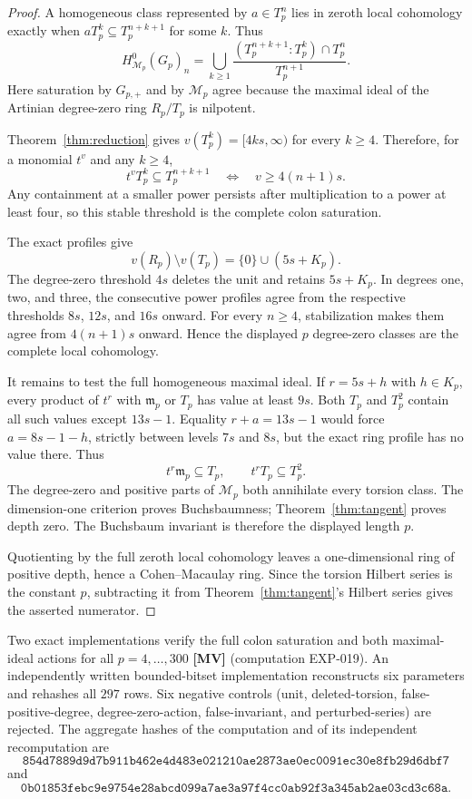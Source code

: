 \documentclass[11pt]{article}
\theoremstyle{definition}
\theoremstyle{remark}
\begin{document}
\begin{proof}
A homogeneous class represented by $a\in T_p^n$ lies in zeroth local cohomology exactly when
$aT_p^k\subseteq T_p^{n+k+1}$ for some $k$. Thus
\[
H^0_{\mathcal M_p}(G_p)_n=
\bigcup_{k\ge1}
\frac{(T_p^{n+k+1}:T_p^k)\cap T_p^n}{T_p^{n+1}}.
\]
Here saturation by $G_{p,+}$ and by $\mathcal M_p$ agree because the maximal ideal of the
Artinian degree-zero ring $R_p/T_p$ is nilpotent.

Theorem~\ref{thm:reduction} gives $v(T_p^k)=[4ks,\infty)$ for every $k\ge4$. Therefore, for a
monomial $t^v$ and any $k\ge4$,
\[
t^vT_p^k\subseteq T_p^{n+k+1}
\quad\Longleftrightarrow\quad
v\ge4(n+1)s.
\]
Any containment at a smaller power persists after multiplication to a power at least four, so
this stable threshold is the complete colon saturation.

The exact profiles give
\[
v(R_p)\setminus v(T_p)=\{0\}\cup(5s+K_p).
\]
The degree-zero threshold $4s$ deletes the unit and retains $5s+K_p$. In degrees one, two, and
three, the consecutive power profiles agree from the respective thresholds $8s$, $12s$, and
$16s$ onward. For every $n\ge4$, stabilization makes them agree from $4(n+1)s$ onward. Hence the
displayed $p$ degree-zero classes are the complete local cohomology.

It remains to test the full homogeneous maximal ideal. If $r=5s+h$ with $h\in K_p$, every product
of $t^r$ with $\mathfrak m_p$ or $T_p$ has value at least $9s$. Both $T_p$ and $T_p^2$ contain
all such values except $13s-1$. Equality $r+a=13s-1$ would force $a=8s-1-h$, strictly between
levels $7s$ and $8s$, but the exact ring profile has no value there. Thus
\[
t^r\mathfrak m_p\subseteq T_p,
\qquad
t^rT_p\subseteq T_p^2.
\]
The degree-zero and positive parts of $\mathcal M_p$ both annihilate every torsion class. The
dimension-one criterion proves Buchsbaumness; Theorem~\ref{thm:tangent} proves depth zero. The
Buchsbaum invariant is therefore the displayed length $p$.

Quotienting by the full zeroth local cohomology leaves a one-dimensional ring of positive depth,
hence a Cohen--Macaulay ring. Since the torsion Hilbert series is the constant $p$, subtracting it
from Theorem~\ref{thm:tangent}'s Hilbert series gives the asserted numerator.
\end{proof}

Two exact implementations verify the full colon saturation and both maximal-ideal actions for all
$p=4,\ldots,300$ \textbf{[MV]} (computation EXP-019). An independently written bounded-bitset
implementation reconstructs six parameters and rehashes all $297$ rows. Six negative controls
(unit, deleted-torsion, false-positive-degree, degree-zero-action, false-invariant, and
perturbed-series) are rejected. The aggregate hashes of the computation and of its independent
recomputation are
\[
\texttt{854d7889d9d7b911b462e4d483e021210ae2873ae0ec0091ec30e8fb29d6dbf7}
\]
and
\[
\texttt{0b01853febc9e9754e28abcd099a7ae3a97f4cc0ab92f3a345ab2ae03cd3c68a}.
\]
\end{document}
